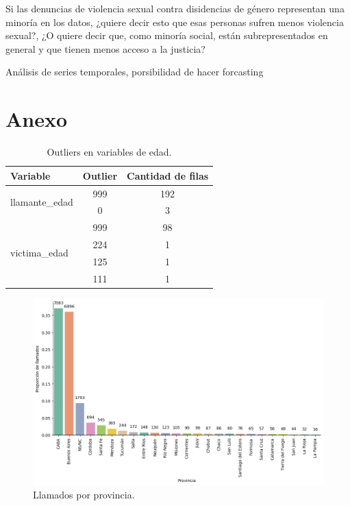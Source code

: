 \documentclass[10 pt]{article}
\begin{document}
Si las denuncias de violencia sexual contra disidencias de género representan una minoría en los datos, ¿quiere decir esto que esas personas sufren menos violencia sexual?, ¿O quiere decir que, como minoría social, están subrepresentados en general y que tienen menos acceso a la justicia?



Análisis de series temporales, porsibilidad de hacer forcasting
\newpage




\newpage
\section*{Anexo}\label{anex}

\begin{table}[H] 
\centering
\caption{Outliers en variables de edad.}
\label{tabla_out}
\begin{tabular}{|l|c|c|}
\hline
\textbf{Variable}                        & \textbf{Outlier} & \textbf{Cantidad de filas} \\ \hline
\multirow{2}{*}{llamante\_edad} & 999     & 192               \\ \cline{2-3} 
                                & 0       & 3                 \\ \hline
\multirow{4}{*}{victima\_edad}  & 999     & 98                \\ \cline{2-3} 
                                & 224     & 1                 \\ \cline{2-3} 
                                & 125     & 1                 \\ \cline{2-3} 
                                & 111     & 1                 \\ \hline
\end{tabular}
\end{table}


\begin{figure}[H]
\begin{center}
\includegraphics[scale=.5]{images/latex_llamados_por_provincia.png}
\caption{Llamados por provincia.}
\label{provincia}
\end{center}
\end{figure}
\end{document}
